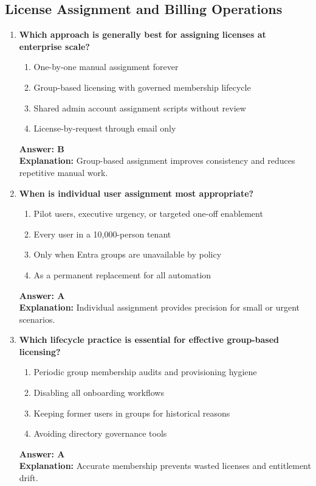 \documentclass[10pt]{article}
\begin{document}
\subsection{License Assignment and Billing Operations}
\begin{enumerate}[leftmargin=*]

\item \textbf{Which approach is generally best for assigning licenses at enterprise scale?}
\begin{enumerate}[label=\Alph*.]
  \item One-by-one manual assignment forever
  \item Group-based licensing with governed membership lifecycle
  \item Shared admin account assignment scripts without review
  \item License-by-request through email only
\end{enumerate}
\textbf{Answer: B}\\
\textbf{Explanation:} Group-based assignment improves consistency and reduces repetitive manual work.

\item \textbf{When is individual user assignment most appropriate?}
\begin{enumerate}[label=\Alph*.]
  \item Pilot users, executive urgency, or targeted one-off enablement
  \item Every user in a 10,000-person tenant
  \item Only when Entra groups are unavailable by policy
  \item As a permanent replacement for all automation
\end{enumerate}
\textbf{Answer: A}\\
\textbf{Explanation:} Individual assignment provides precision for small or urgent scenarios.

\item \textbf{Which lifecycle practice is essential for effective group-based licensing?}
\begin{enumerate}[label=\Alph*.]
  \item Periodic group membership audits and provisioning hygiene
  \item Disabling all onboarding workflows
  \item Keeping former users in groups for historical reasons
  \item Avoiding directory governance tools
\end{enumerate}
\textbf{Answer: A}\\
\textbf{Explanation:} Accurate membership prevents wasted licenses and entitlement drift.


\end{enumerate}
\end{document}
